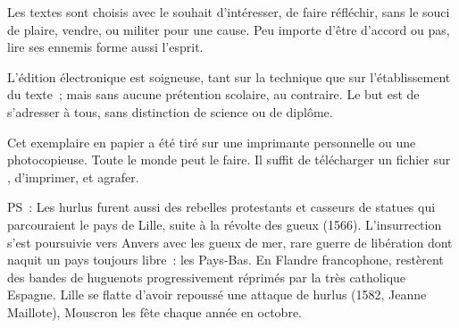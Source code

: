 \documentclass[french,twoside]{book} %
\newif\ifdev
\renewcommand{\LettrineFontHook}{\color{rubric}}
\newcommand{\initialiv}[2]{%
  \let\oldLFH\LettrineFontHook
  \IfSubStr{QJ’}{#1}{
    \lettrine[lines=4, lhang=0.2, loversize=-0.1, lraise=0.2]{\smash{#1}}{#2}
  }{\IfSubStr{É}{#1}{
    \lettrine[lines=4, lhang=0.2, loversize=-0, lraise=0]{\smash{#1}}{#2}
  }{\IfSubStr{ÀÂ}{#1}{
    \lettrine[lines=4, lhang=0.2, loversize=-0, lraise=0, slope=0.6em]{\smash{#1}}{#2}
  }{\IfSubStr{A}{#1}{
    \lettrine[lines=4, lhang=0.2, loversize=0.2, slope=0.6em]{\smash{#1}}{#2}
  }{\IfSubStr{V}{#1}{
    \lettrine[lines=4, lhang=0.2, loversize=0.2, slope=-0.5em]{\smash{#1}}{#2}
  }{
    \lettrine[lines=4, lhang=0.2, loversize=0.2]{\smash{#1}}{#2}
  }}}}}
  \let\LettrineFontHook\oldLFH
}
\renewcommand{\LettrineFontHook}{\bfseries\color{rubric}}
\begin{document}
  Les textes sont choisis avec le souhait d’intéresser, de faire réfléchir,
  sans le souci de plaire, vendre, ou militer pour une cause.
  Peu importe d’être d’accord ou pas, lire ses ennemis forme aussi l’esprit.
  \par

  L’édition électronique est soigneuse, tant sur la technique
  que sur l’établissement du texte ; mais sans aucune prétention scolaire, au contraire.
  Le but est de s’adresser à tous, sans distinction de science ou de diplôme.
  \par

  Cet exemplaire en papier a été tiré sur une imprimante personnelle
   ou une photocopieuse. Toute le monde peut le faire.
  Il suffit de
  télécharger un fichier sur \href{https://hurlus.fr}{},
  d’imprimer, et agrafer.\par

  \bigskip

  \noindent PS : Les hurlus furent aussi des rebelles protestants et casseurs de statues qui parcouraient le pays de Lille, suite à la révolte des gueux (1566).
  L’insurrection s’est poursuivie vers Anvers avec les gueux de mer, rare guerre de libération dont naquit un pays toujours libre : les Pays-Bas.
  En Flandre francophone, restèrent des bandes de huguenots progressivement réprimés par la très catholique Espagne.
  Lille se flatte d’avoir repoussé une attaque de hurlus (1582, Jeanne Maillote), Mouscron les fête chaque année en octobre.
\fi

\ifdev %
\fontname\font — \textsc{Les règles du jeu}\par
(\hyperref[utopie]{\underline{Lien}})\par
\noindent \initialiv{A}{lors là}\blindtext\par
\noindent \initialiv{À}{ la bonheur des dames}\blindtext\par
\noindent \initialiv{É}{tonnez-le}\blindtext\par
\noindent \initialiv{Q}{ualitativement}\blindtext\par
\noindent \initialiv{V}{aloriser}\blindtext\par
\Blindtext
\phantomsection
\label{utopie}
\Blinddocument
\fi
\end{document}
